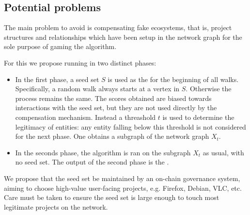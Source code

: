 \subsection{Potential problems}

The main problem to avoid is compensating fake ecosystems, that is,
project structures and relationships which have been setup in the
network graph for the sole purpose of gaming the \osrank{} algorithm.

For this we propose running \osrank{} in two distinct phases:
\begin{itemize}
\item In the first phase, a seed set $S$ is used as the for the
  beginning of all walks. Specifically, a random walk always starts at
  a vertex in $S$. Otherwise the process remains the same. The scores
  obtained are biased towards interactions with the seed set, but they
  are not used directly by the compensation mechanism. Instead a
  threashold $t$ is used to determine the legitimacy of entities: any
  entity falling below this threshold is not considered for the next
  phase. One obtains a subgraph of the network graph $X_t$.
\item In the seconds phase, the algorithm is ran on the subgraph $X_t$
  as usual, with no seed set. The output of the second phase is the
  \osrank{}.
\end{itemize}

We propose that the seed set be maintained by an on-chain governance
system, aiming to choose high-value user-facing projects,
e.g. Firefox, Debian, VLC, etc. Care must be taken to ensure the seed
set is large enough to touch most legitimate projects on the network.



